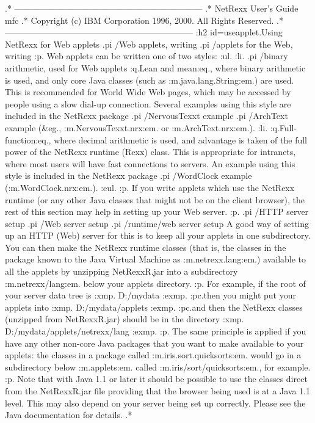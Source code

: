 .* ------------------------------------------------------------------
.* NetRexx User's Guide                                              mfc
.* Copyright (c) IBM Corporation 1996, 2000.  All Rights Reserved.
.* ------------------------------------------------------------------
:h2 id=useapplet.Using NetRexx for Web applets
.pi /Web applets, writing
.pi /applets for the Web, writing
:p.
Web applets can be written one of two styles:
:ul.
:li.
.pi /binary arithmetic, used for Web applets
:q.Lean and mean:eq., where binary arithmetic is used, and only core
Java classes (such as :m.java.lang.String:em.) are used.  This is
recommended for World Wide Web pages, which may be accessed by people
using a slow dial-up connection.
Several examples using this style are included in the NetRexx package
.pi /NervousTexxt example
.pi /ArchText example
(&eg., :m.NervousTexxt.nrx:em. or :m.ArchText.nrx:em.).
:li.
:q.Full-function:eq., where decimal arithmetic is used, and advantage is
taken of the full power of the NetRexx runtime (Rexx) class.
This is appropriate for intranets, where most users will have fast
connections to servers.
An example using this style is included in the NetRexx package
.pi /WordClock example
(:m.WordClock.nrx:em.).
:eul.
:p.
If you write applets which use the NetRexx runtime (or any other Java
classes that might not be on the client browser), the rest of this
section may help in setting up your Web server.
:p.
.pi /HTTP server setup
.pi /Web server setup
.pi /runtime/web server setup
A good way of setting up an HTTP (Web) server for this is to keep all
your applets in one subdirectory.  You can then make the NetRexx runtime
classes (that is, the classes in the package known to the Java Virtual
Machine as :m.netrexx.lang:em.) available to all the applets by
unzipping NetRexxR.jar into a subdirectory :m.netrexx/lang:em. below
your applets directory.
:p.
For example, if the root of your server data tree is
:xmp.
D:/mydata
:exmp.
:pc.then you might put your applets into
:xmp.
D:/mydata/applets
:exmp.
:pc.and then the NetRexx classes (unzipped from NetRexxR.jar) should be in
the directory
:xmp.
D:/mydata/applets/netrexx/lang
:exmp.
:p.
The same principle is applied if you have any other non-core Java
packages that you want to make available to your applets: the classes in
a package called :m.iris.sort.quicksorts:em. would go in a subdirectory
below :m.applets:em. called :m.iris/sort/quicksorts:em., for example.
:p.
Note that with Java 1.1 or later it should be possible to use the
classes direct from the NetRexxR.jar file providing that the browser
being used is at a Java 1.1 level.  This may also depend on your server
being set up correctly.  Please see the Java documentation for details.
.*
